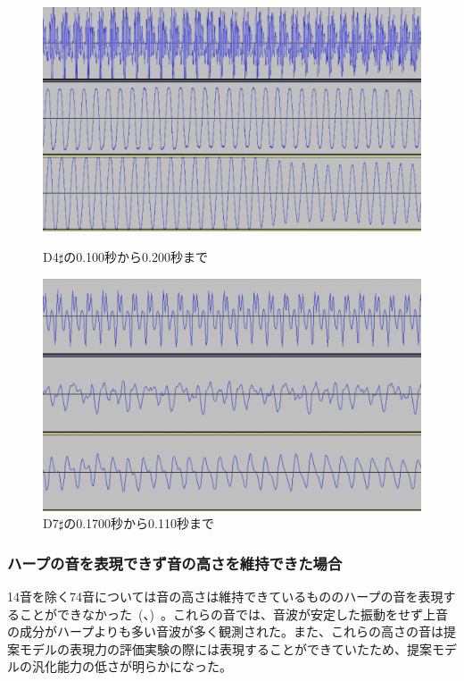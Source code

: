 \begin{figure}[b]
\centering
\begin{minipage}{0.48\columnwidth}
\centering
\includegraphics[width=0.85\columnwidth]{figure/66_22_det/d4s_0100_0200.png}
\caption[D4$\sharp$の音波]{D4$\sharp$の0.100秒から0.200秒まで}
\label{fig:66_22_near}
\end{minipage}
\begin{minipage}{0.48\columnwidth}
\centering
\includegraphics[width=0.85\columnwidth]{figure/66_22_det/d7s_0100_0110.png}
\caption[D7$\sharp$の音波]{D7$\sharp$の0.1700秒から0.110秒まで}
\label{fig:66_22_bad4}
\end{minipage}
\end{figure}

\clearpage

\subsubsection{ハープの音を表現できず音の高さを維持できた場合}

14音を除く74音については音の高さは維持できているもののハープの音を表現することができなかった~(、)~。これらの音では、音波が安定した振動をせず上音の成分がハープよりも多い音波が多く観測された。また、これらの高さの音は提案モデルの表現力の評価実験の際には表現することができていたため、提案モデルの汎化能力の低さが明らかになった。

